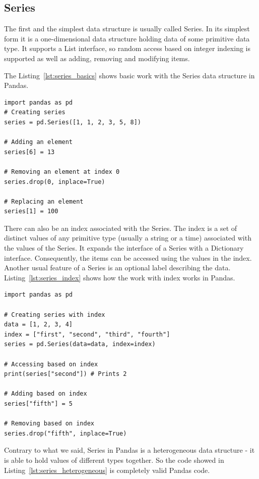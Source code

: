 \subsection{Series}

The first and the simplest data structure is usually called Series.
In its simplest form it is a one-dimensional data structure holding data of some primitive data type.
It supports a List interface, so random access based on integer indexing is supported as well as adding, removing and
modifying items.

The Listing~\ref{lst:series_basics} shows basic work with the Series data structure in Pandas.

\begin{lstlisting}[caption=Working with Series in Pandas, label={lst:series_basics}, captionpos=b]
import pandas as pd
# Creating series
series = pd.Series([1, 1, 2, 3, 5, 8])

# Adding an element
series[6] = 13

# Removing an element at index 0
series.drop(0, inplace=True)

# Replacing an element
series[1] = 100
\end{lstlisting}

There can also be an index associated with the Series.
The index is a set of distinct values of any primitive type (usually a string or a time) associated with the values of
the Series.
It expands the interface of a Series with a Dictionary interface.
Consequently, the items can be accessed using the values in the index.
Another usual feature of a Series is an optional label describing the data.
Listing~\ref{lst:series_index} shows how the work with index works in Pandas.

\begin{lstlisting}[caption=Index on a Series, label={lst:series_index}, captionpos=b]
import pandas as pd

# Creating series with index
data = [1, 2, 3, 4]
index = ["first", "second", "third", "fourth"]
series = pd.Series(data=data, index=index)

# Accessing based on index
print(series["second"]) # Prints 2

# Adding based on index
series["fifth"] = 5

# Removing based on index
series.drop("fifth", inplace=True)

\end{lstlisting}

Contrary to what we said, Series in Pandas is a heterogeneous data structure - it is able to hold values of different
types together.
So the code showed in Listing~\ref{lst:series_heterogeneous} is completely valid Pandas code.

